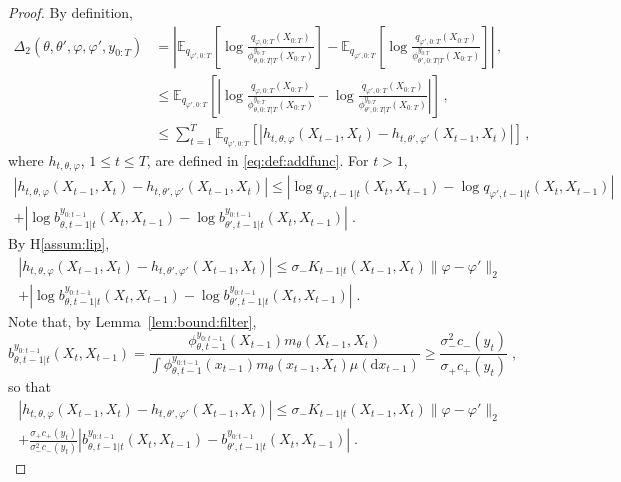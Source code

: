 \documentclass{article}
\newcommand{\1}{\mathbbm{1}}
\newcommand{\rmd}{\ensuremath{\mathrm{d}}}
\newcommand{\eqsp}{\;}
\begin{document}
\begin{proof}
By definition, 
\begin{align*}
\Delta_2(\theta, \theta', \varphi, \varphi', y_{0:T}) &= \left|\mathbb{E}_{q_{\varphi',0:T}}\left[\log \frac{q_{\varphi,0:T}(X_{0:T})}{\phi^{y_{0:T}}_{\theta,0:T|T}(X_{0:T})}\right] - \mathbb{E}_{q_{\varphi',0:T}}\left[\log \frac{q_{\varphi',0:T}(X_{0:T})}{\phi^{y_{0:T}}_{\theta',0:T|T}(X_{0:T})}\right]\right|\,,\\
&\leq \mathbb{E}_{q_{\varphi',0:T}}\left[\left|\log \frac{q_{\varphi,0:T}(X_{0:T})}{\phi^{y_{0:T}}_{\theta,0:T|T}(X_{0:T})} - \log \frac{q_{\varphi',0:T}(X_{0:T})}{\phi^{y_{0:T}}_{\theta',0:T|T}(X_{0:T})}\right|\right]\,,\\
&\leq \sum_{t=1}^T\mathbb{E}_{q_{\varphi',0:T}}\left[\left|h_{t,\theta,\varphi}(X_{t-1},X_t)-h_{t,\theta',\varphi'}(X_{t-1},X_t)\right|\right]\,,
\end{align*}
where $h_{t,\theta,\varphi}$, $1\leq t\leq T$,  are defined in \eqref{eq:def:addfunc}. For $t>1$,
\begin{multline*}
\left|h_{t,\theta,\varphi}(X_{t-1},X_t)-h_{t,\theta',\varphi'}(X_{t-1},X_t)\right| \leq \left|\log q_{\varphi,t-1|t}(X_t,X_{t-1}) - \log q_{\varphi',t-1|t}(X_t,X_{t-1})\right|\\
+ \left|\log b^{y_{0:t-1}}_{\theta,t-1|t}(X_t,X_{t-1})- \log b^{y_{0:t-1}}_{\theta',t-1|t}(X_t,X_{t-1})\right|\eqsp.
\end{multline*}
By H\ref{assum:lip},
\begin{multline*}
\left|h_{t,\theta,\varphi}(X_{t-1},X_t)-h_{t,\theta',\varphi'}(X_{t-1},X_t)\right| \leq \sigma_- K_{t-1|t}(X_{t-1},X_t)\|\varphi-\varphi'\|_2 \\
+ \left|\log b^{y_{0:t-1}}_{\theta,t-1|t}(X_t,X_{t-1})- \log b^{y_{0:t-1}}_{\theta',t-1|t}(X_t,X_{t-1})\right|\eqsp.
\end{multline*}
Note that, by Lemma~\ref{lem:bound:filter},
$$
b^{y_{0:t-1}}_{\theta,t-1|t}(X_t,X_{t-1}) = \frac{\phi_{\theta,t-1}^{y_{0:t-1}}(X_{t-1})m_\theta(X_{t-1},X_t)}{\int \phi_{\theta,t-1}^{y_{0:t-1}}(x_{t-1})m_\theta(x_{t-1},X_t)\mu(\rmd x_{t-1})}\geq \frac{\sigma^2_-c_-(y_t)}{\sigma_+c_+(y_t)}\eqsp,
$$
so that
\begin{multline*}
\left|h_{t,\theta,\varphi}(X_{t-1},X_t)-h_{t,\theta',\varphi'}(X_{t-1},X_t)\right| \leq \sigma_- K_{t-1|t}(X_{t-1},X_t)\|\varphi-\varphi'\|_2 \\
+ \frac{\sigma_+c_+(y_t)}{\sigma^2_-c_-(y_t)}\left|b^{y_{0:t-1}}_{\theta,t-1|t}(X_t,X_{t-1})- b^{y_{0:t-1}}_{\theta',t-1|t}(X_t,X_{t-1})\right|\eqsp.

\end{multline*}
\end{proof}
\end{document}
